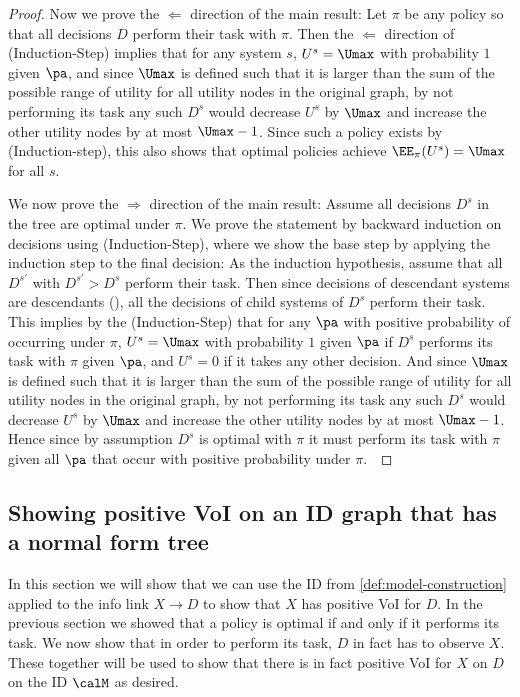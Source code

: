 \begin{proof}
    Now we prove the $\Leftarrow$ direction of the main result: Let $\pi$ be any policy so that all decisions $D$ perform their task with $\pi$. Then the $\Leftarrow$ direction of (Induction-Step) implies that for any system $s$, $U^s=\Umax$ with probability $1$ given $\pa$, and since $\Umax$ is defined such that it is larger than the sum of the possible range of utility for all utility nodes in the original graph, by not performing its task any such $D^s$ would decrease $U^s$ by $\Umax$ and increase the other utility nodes by at most $\Umax -1$.
    Since such a policy exists by (Induction-step), this also shows that optimal policies achieve $\EE_\pi(U^s)=\Umax$ for all $s$.~
    
    We now  prove the $\Rightarrow$ direction of the main result: Assume all decisions $D^s$ in the tree are optimal under $\pi$. We prove the statement by backward induction on decisions using (Induction-Step), where we show the base step by applying the induction step to the final decision: As the induction hypothesis, assume that all $D^{s'}$ with $D^{s'}>D^s$ 
    perform their task. Then since decisions of descendant systems are descendants (), all the decisions of child systems of $D^s$ perform their task. This implies by the (Induction-Step) that for any $\pa$ with positive probability of occurring under $\pi$, 
    $U^s=\Umax$ with probability $1$ given $\pa$ if $D^s$ performs its task with $\pi$ given $\pa$, and $U^s=0$ if it takes any other decision. And since $\Umax$ is defined such that it is larger than the sum of the possible range of utility for all utility nodes in the original graph, by not performing its task any such $D^s$ would decrease $U^s$ by $\Umax$ and increase the other utility nodes by at most $\Umax -1$. Hence since by assumption $D^s$ is optimal with $\pi$ it must perform its task with $\pi$ given all $\pa$ that occur with positive probability under $\pi$.~
\end{proof}



\subsection{Showing positive VoI on an ID graph that has a normal form tree} \label{sec:model-has-incentives}

In this section we will show that we can use the ID from \autoref{def:model-construction} applied to the info link $X\to D$ to show that $X$ has positive VoI for $D$.
In the previous section we showed that a policy is optimal if and only if it performs its task. We now show that in order to perform its task, $D$ in fact has to observe $X$. These together will be used to show that there is in fact positive VoI for $X$ on $D$ on the ID $\calM$ as desired.~



